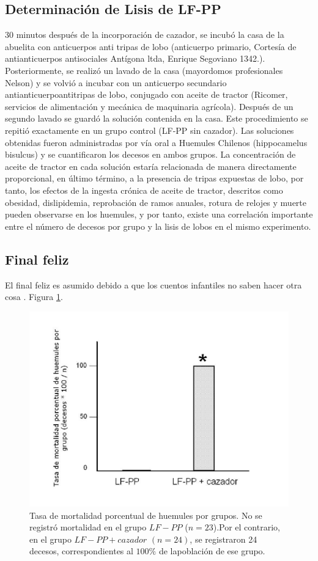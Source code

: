 \documentclass[fleqn,10pt]{AmateCodex} %
\begin{document}
\subsection{Determinación de Lisis de LF-PP}
30 minutos después de la incorporación de cazador,
se incubó la casa de la abuelita con anticuerpos anti
tripas de lobo (anticuerpo primario, Cortesía de
antianticuerpos antisociales Antígona ltda, Enrique
Segoviano 1342.). Posteriormente, se realizó un
lavado de la casa (mayordomos profesionales
Nelson) y se volvió a incubar con un anticuerpo
secundario antianticuerpoantitripas
de
lobo,
conjugado con aceite de tractor (Ricomer, servicios
de alimentación y mecánica de maquinaria agrícola).
Después de un segundo lavado se guardó la solución
contenida en la casa. Este procedimiento se repitió
exactamente en un grupo control (LF-PP sin
cazador). Las soluciones obtenidas fueron
administradas por vía oral a Huemules Chilenos
(hippocamelus bisulcus) y se cuantificaron los
decesos en ambos grupos. La concentración de
aceite de tractor en cada solución estaría relacionada
de manera directamente proporcional, en último
término, a la presencia de tripas expuestas de lobo,
por tanto, los efectos de la ingesta crónica de aceite
de tractor, descritos como obesidad, dislipidemia,
reprobación de ramos anuales, rotura de relojes y
muerte \cite{Guaton} pueden observarse en los huemules, y por
tanto, existe una correlación importante entre el
número de decesos por grupo y la lisis de lobos en el
mismo experimento.

\subsection{Final feliz}
El final feliz es asumido debido a que los cuentos
infantiles no saben hacer otra cosa \cite{Conocimientoc}.
Figura \ref{fig:Caperucita-Fig01}.

\begin{figure}[h]\centering
\includegraphics[width=\linewidth]{imagenes/Caperucita-Fig01.png}
\caption{Tasa de mortalidad porcentual de huemules por grupos. No se registró mortalidad en el grupo $LF-PP$ ($n = 23$).Por el contrario, en el grupo $LF-PP + cazador$ $(n = 24)$, se registraron 24 decesos, correspondientes al $100\%$ de lapoblación de ese grupo.}
\label{fig:Caperucita-Fig01}
\end{figure}
\end{document}
